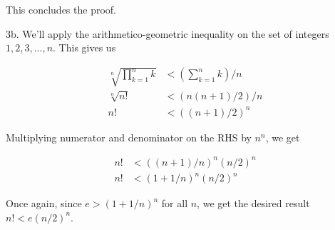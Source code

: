 \documentclass{article}
\begin{document}
This concludes the proof.

3b. We'll apply the arithmetico-geometric inequality on the set of integers ${1, 2, 3, ..., n}$. This gives us

\begin{align*}
    \sqrt[n]{\prod_{k = 1}^n k} &< (\sum_{k = 1}^n k) / n \\
    \sqrt[n]{n!} &< (n(n + 1) / 2) / n \\
    n! &< ((n + 1) / 2)^n
\end{align*}

Multiplying numerator and denominator on the RHS by $n^n$, we get

\begin{align*}
    n! &< ((n + 1) / n)^n (n / 2)^n \\
    n! &< (1 + 1 / n)^n (n / 2)^n
\end{align*}

Once again, since $e > (1 + 1 / n)^n$ for all $n$, we get the desired result $n! < e(n / 2)^n$.
\end{document}

